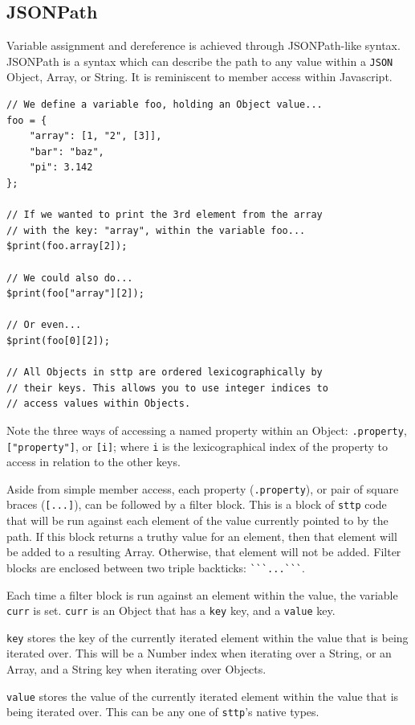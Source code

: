 \documentclass[]{full}
\theoremstyle{definition}
\begin{document}
\subsection{JSONPath}

Variable assignment and dereference is achieved through JSONPath-like syntax. JSONPath is a syntax which can describe the path to any value within a \verb|JSON| Object, Array, or String. It is reminiscent to member access within Javascript.

\begin{verbatim}
// We define a variable foo, holding an Object value...
foo = {
    "array": [1, "2", [3]],
    "bar": "baz",
    "pi": 3.142
};

// If we wanted to print the 3rd element from the array
// with the key: "array", within the variable foo...
$print(foo.array[2]);

// We could also do...
$print(foo["array"][2]);

// Or even...
$print(foo[0][2]);

// All Objects in sttp are ordered lexicographically by
// their keys. This allows you to use integer indices to
// access values within Objects.
\end{verbatim}

Note the three ways of accessing a named property within an Object: \verb|.property|, \verb|["property"]|, or \verb|[i]|; where \verb|i| is the lexicographical index of the property to access in relation to the other keys.

Aside from simple member access, each property (\verb|.property|), or pair of square braces (\verb|[...]|), can be followed by a filter block. This is a block of \verb|sttp| code that will be run against each element of the value currently pointed to by the path. If this block returns a truthy value for an element, then that element will be added to a resulting Array. Otherwise, that element will not be added. Filter blocks are enclosed between two triple backticks: \verb|```...```|.

Each time a filter block is run against an element within the value, the variable \verb|curr| is set. \verb|curr| is an Object that has a \verb|key| key, and a \verb|value| key.

\verb|key| stores the key of the currently iterated element within the value that is being iterated over. This will be a Number index when iterating over a String, or an Array, and a String key when iterating over Objects.

\verb|value| stores the value of the currently iterated element within the value that is being iterated over. This can be any one of \verb|sttp|'s native types.
\end{document}
